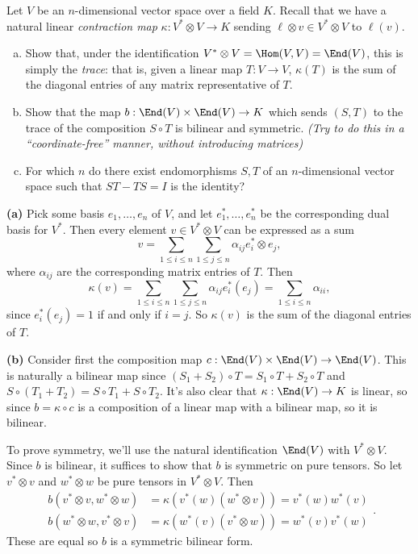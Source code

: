 \documentclass[11pt,letterpaper]{article}
\begin{document}
\pagebreak
\begin{problem}
  Let $V$ be an $n$-dimensional vector space over a field $K$. Recall that we have a natural linear \emph{contraction map} $\kappa : V^* \otimes V \to K$ sending $\ell \otimes v \in V^* \otimes V$ to $\ell(v)$. 
  \begin{enumerate}[(a)]
    \item Show that, under the identification  $V^* \otimes V = \Hom(V,V) = \End(V)$, this is simply the \emph{trace}: that is, given a linear map $T : V \to V$, $\kappa(T)$ is the sum of the diagonal entries of any matrix representative of $T$.
    \item Show that the map  $b : \End(V) \times \End(V) \to K$ which sends $(S,T)$ to the trace of the composition $S \circ T$ is bilinear and symmetric. \textit{(Try to do this in a ``coordinate-free'' manner, without introducing matrices)}
    \item For which $n$ do there exist endomorphisms $S, T$ of an $n$-dimensional vector space such that $ST - TS = I$ is the identity?
  \end{enumerate}
\end{problem}

\textbf{(a)} Pick some basis $e_1,\ldots, e_n$ of $V$, and let $e_1^*,\ldots,e_n^*$ be the corresponding dual basis for $V^*$. Then every element $v\in V^*\otimes V$ can be expressed as a sum
\[
  v=\sum_{1\leq i\leq n}\sum_{1\leq j\leq n}\alpha_{ij}e^*_i\otimes e_j
,\] 
where $\alpha_{ij}$ are the corresponding matrix entries of $T$. Then
\[
  \kappa(v)=\sum_{1\leq i\leq n}\sum_{1\leq j\leq n}\alpha_{ij}e^*_i(e_j)=\sum_{1\leq i \leq n}\alpha_{ii}
,\]       
since $e^*_i(e_j)=1$ if and only if $i=j$. So $\kappa(v)$ is the sum of the diagonal entries of $T$.   

\textbf{(b)} Consider first the composition map $c : \End(V)\times \End(V)\to \End(V)$. This is naturally a bilinear map since $(S_1+S_2)\circ T = S_1\circ T + S_2\circ T$ and $S\circ (T_1+T_2) = S\circ T_1+S\circ T_2$. It's also clear that $\kappa : \End(V) \to K$ is linear, so since $b=\kappa \circ c$ is a composition of a linear map with a bilinear map, so it is bilinear.      

To prove symmetry, we'll use the natural identification $\End(V)$ with $V^*\otimes V$. Since $b$ is bilinear, it suffices to show that $b$ is symmetric on pure tensors. So let $v^*\otimes v$ and $w^*\otimes w$ be pure tensors in $V^*\otimes V$. Then
\[
  \begin{aligned}
    b(v^*\otimes v, w^*\otimes w)&=\kappa(v^*(w)(w^*\otimes v))=v^*(w)w^*(v)\\
    b(w^*\otimes w, v^*\otimes v)&=\kappa(w^*(v)(v^*\otimes w))=w^*(v)v^*(w)
  \end{aligned}.
\]    
These are equal so $b$ is a symmetric bilinear form.
\end{document}
